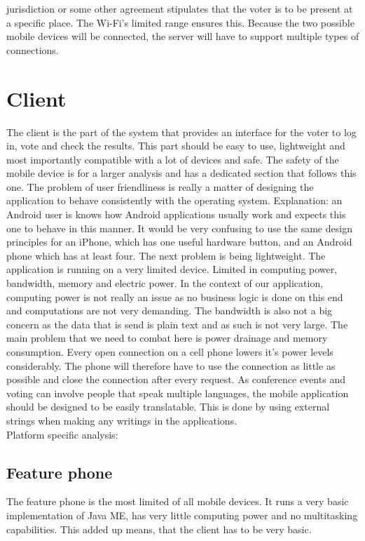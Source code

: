\documentclass[11pt,twoside,a4paper]{book}
\begin{document}
jurisdiction or some other agreement stipulates that the voter is to be present at a specific place. The Wi-Fi's limited range ensures this. Because the two possible mobile devices will be connected, the server will have to support multiple types of connections.

\section{Client}
The client is the part of the system that provides an interface for the voter to log in, vote and check the results. This part should be easy to use, lightweight and most importantly compatible with a lot of devices and safe. The safety of the mobile device is for a larger analysis and has a dedicated section that follows this one. The problem of user friendliness is really a matter of designing the application to behave consistently with the operating system. Explanation: an Android user is knows how Android applications usually work and expects this one to behave in this manner. It would be very confusing to use the same design principles for an iPhone, which has one useful hardware button, and an Android phone which has at least four. The next problem is being lightweight. The application is running on a very limited device. Limited in computing power, bandwidth, memory and electric power. In the context of our application, computing power is not really an issue as no business logic is done on this end and computations are not very demanding. The bandwidth is also not a big concern as the data that is send is plain text and as such is not very large. The main problem that we need to combat here is power drainage and memory consumption. Every open connection on a cell phone lowers it's power levels considerably. The phone will therefore have to use the connection as little as possible and close the connection after every request. As conference events and voting can involve people that speak multiple languages, the mobile application should be designed to be easily translatable. This is done by using external strings when making any writings in the applications.\\
Platform specific analysis:
\subsection{Feature phone}
The feature phone is the most limited of all mobile devices. It runs a very basic implementation of Java ME, has very little computing power and no multitasking capabilities. This added up means, that the client has to be very basic.
\end{document}
